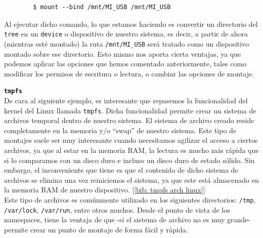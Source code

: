 \documentclass[a4paper, oneside, 12pt]{book}
\begin{document}
	\begin{verbatim}
		$ mount --bind /mnt/MI_USB /mnt/MI_USB
	\end{verbatim}
	
	\noindent Al ejecutar dicho comando, lo que estamos haciendo es convertir un directorio del \texttt{tree} en un \texttt{device} o dispositivo de nuestro sistema, es decir, a partir de ahora (mientras esté montado) la ruta \texttt{/mnt/MI\_USB} será tratado como un dispositivo montado sobre ese directorio. Esto mismo nos aporta cierta ventajas, ya que podemos aplicar las opciones que hemos comentado anteriormente, tales como modificar los permisos de escritura o lectura, o cambiar las opciones de montaje.
	
	\pagebreak
	
	\noindent \textbf{\large \texttt{tmpfs}}\\
	
	\noindent De cara al siguiente ejemplo, es interesante que repasemos la funcionalidad del kernel del Linux llamada \texttt{tmpfs}. Dicha funcionalidad permite crear un sistema de archivos temporal dentro de nuestro sistema. El sistema de archivo creado reside completamente en la memoria y/o ``swap'' de nuestro sistema. Este tipo de montajes suele ser muy interesante cuando necesitamos agilizar el acceso a ciertos archivos, ya que al estar en la memoria RAM, la lectura es mucho más rápida que si lo comparamos con un disco duro e incluso un disco duro de estado sólido. Sin embargo, el inconveniente que tiene es que el contenido de dicho sistema de archivos se elimina una vez reiniciemos el sistema, ya que este está almacenado en la memoria RAM de nuestro dispositivo. [\ref{bib: tmpfs arch linux}] \\
	
	\noindent Este tipo de archivos es comúnmente utilizado en los siguientes directorios: \texttt{/tmp}, \texttt{/var/lock}, \texttt{/var/run}, entre otros muchos. Desde el punto de vista de los namespaces, tiene la ventaja de que -si el sistema de archivo no es muy grande- permite crear un punto de montaje de forma fácil y rápida. \\
	
\end{document}
